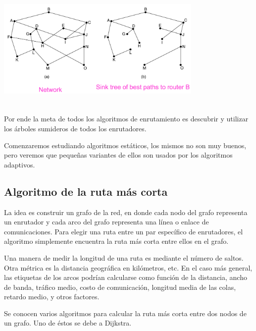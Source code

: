 \documentclass[10pt,a4paper]{report}
\begin{document}
	\begin{center}
		\includegraphics[width=10cm, height=6cm]{./imagenes/optimalidad.png}
	\end{center}

	\par Por ende la meta de todos los algoritmos de enrutamiento es descubrir y utilizar 
	los árboles sumideros de todos los enrutadores.
	
	\par Comenzaremos estudiando algoritmos estáticos, los mismos no son muy 
	buenos, pero veremos que pequeñas variantes de ellos son usados por los algoritmos 
	adaptivos.

\subsection{Algoritmo de la ruta más corta}
	\par La idea es construir un grafo de la red, en donde cada nodo del grafo 
	representa un enrutador y cada arco del grafo representa una línea o enlace de 
	comunicaciones. Para elegir una ruta entre un par específico de enrutadores, el 
	algoritmo simplemente encuentra la ruta más corta entre ellos en el grafo.

	\par Una manera de medir la longitud de una ruta es mediante el número de saltos. 
	Otra métrica es la distancia geográfica en kilómetros, etc. En el caso más general, las 
	etiquetas de los arcos podrían calcularse como función de la distancia, ancho de 
	banda, tráfico medio, costo de comunicación, longitud media de las colas, retardo 
	medio, y otros factores.

	\par Se conocen varios algoritmos para calcular la ruta más corta entre dos nodos de 
	un grafo. Uno de éstos se debe a Dijkstra.
\end{document}
